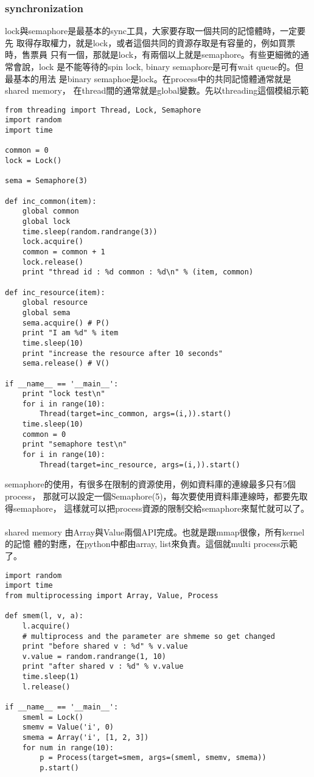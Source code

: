     \subsubsection{synchronization}
    lock與semaphore是最基本的sync工具，大家要存取一個共同的記憶體時，一定要先
    取得存取權力，就是lock，或者這個共同的資源存取是有容量的，例如買票時，售票員
    只有一個，那就是lock，有兩個以上就是semaphore。有些更細微的通常會說，lock
    是不能等待的spin lock, binary semaphore是可有wait queue的。但最基本的用法
    是binary semaphoe是lock。在process中的共同記憶體通常就是shared memory，
    在thread間的通常就是global變數。先以threading這個模組示範
    \begin{verbatim}
from threading import Thread, Lock, Semaphore
import random
import time

common = 0
lock = Lock()

sema = Semaphore(3)

def inc_common(item):
	global common
	global lock
	time.sleep(random.randrange(3))
	lock.acquire()
	common = common + 1
	lock.release()
	print "thread id : %d common : %d\n" % (item, common)

def inc_resource(item):
	global resource
	global sema
	sema.acquire() # P()
	print "I am %d" % item
	time.sleep(10)
	print "increase the resource after 10 seconds"
	sema.release() # V()
	
if __name__ == '__main__':
	print "lock test\n"
	for i in range(10):
		Thread(target=inc_common, args=(i,)).start()
	time.sleep(10)
	common = 0
	print "semaphore test\n"
	for i in range(10):
		Thread(target=inc_resource, args=(i,)).start()

    \end{verbatim}
    semaphore的使用，有很多在限制的資源使用，例如資料庫的連線最多只有5個process，
    那就可以設定一個Semaphore(5)，每次要使用資料庫連線時，都要先取得semaphore，
    這樣就可以把process資源的限制交給semaphore來幫忙就可以了。
    \\\\
    shared memory 由Array與Value兩個API完成。也就是跟mmap很像，所有kernel的記憶
    體的對應，在python中都由array, list來負責。這個就multi process示範了。
    \begin{verbatim}
import random
import time
from multiprocessing import Array, Value, Process

def smem(l, v, a):
    l.acquire()
    # multiprocess and the parameter are shmeme so get changed
    print "before shared v : %d" % v.value
    v.value = random.randrange(1, 10)
    print "after shared v : %d" % v.value
    time.sleep(1)
    l.release()

if __name__ == '__main__':
    smeml = Lock()
    smemv = Value('i', 0)
    smema = Array('i', [1, 2, 3])
    for num in range(10):
        p = Process(target=smem, args=(smeml, smemv, smema))
        p.start()
    \end{verbatim}
